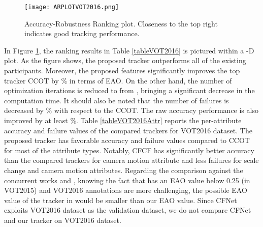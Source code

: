 \documentclass[journal]{IEEEtran}
\begin{document}
\begin{figure}[ht]
\centering
\texttt{[image: ARPLOTVOT2016.png]}
\caption{Accuracy-Robustness Ranking plot. Closeness to the top right indicates good tracking performance.}
\label{ARPLOTVOT2016}
\end{figure}
In Figure \ref{ARPLOTVOT2016}, the ranking results in Table \ref{tableVOT2016} is pictured within a -D plot. As the figure shows, the proposed tracker outperforms all of the existing participants. Moreover, the proposed features significantly improves the top tracker CCOT by \% in terms of EAO. On the other hand, the number of optimization iterations is reduced to  from , bringing a significant decrease in the computation time. It should also be noted that the number of failures is decreased by \% with respect to the CCOT. The raw accuracy performance is also improved by at least \%. Table \ref{tableVOT2016Attr} reports the per-attribute accuracy and failure values of the compared trackers for VOT2016 dataset. The proposed tracker has favorable accuracy and failure values compared to CCOT for most of the attribute types. Notably, CFCF has significantly better accuracy than the compared trackers for camera motion attribute and less failures for scale change and camera motion attributes. Regarding the comparison against the concurrent works \cite{CFNet} and \cite{DCFNet}, knowing the fact that \cite{DCFNet} has an EAO value below 0.25 (in VOT2015) and VOT2016 annotations are more challenging, the possible EAO value of the tracker in \cite{DCFNet} would be smaller than our EAO value. Since CFNet \cite{CFNet} exploits VOT2016 dataset as the validation dataset, we do not compare CFNet \cite{CFNet} and our tracker on VOT2016 dataset.
\end{document}
